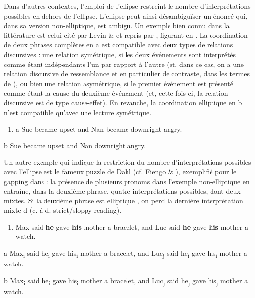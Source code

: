 Dans d'autres contextes, l'emploi de l'ellipse restreint le nombre d'interprétations possibles en dehors de l'ellipse. L'ellipse peut ainsi désambiguïser un énoncé qui, dans sa version non-elliptique, est ambigu. Un exemple bien connu dans la littérature est celui cité par Levin \& \citet{Prince1986} et repris par \citet{Kehler2002}, figurant en . La coordination de deux phrases complètes en a est compatible avec deux types de relations discursives : une relation symétrique, si les deux événements sont interprétés comme étant indépendants l'un par rapport à l'autre (et, dans ce cas, on a une relation discursive de ressemblance et en particulier de contraste, dans les termes de \citet{Kehler2002}), ou bien une relation asymétrique, si le premier événement est présenté comme étant la cause du deuxième événement (et, cette fois-ci, la relation discursive est de type cause-effet). En revanche, la coordination elliptique en b n'est compatible qu'avec une lecture symétrique. 


\begin{enumerate}
\item \label{bkm:Ref286308655}a  Sue became upset and Nan became downright angry.  


\end{enumerate}
  b  Sue became upset and Nan downright angry.  

Un autre exemple qui indique la restriction du nombre d'interprétations possibles avec l'ellipse est le fameux puzzle de Dahl (cf. Fiengo \& \citet{May1994}), exemplifié pour le gapping dans \citet{Coppock2001} : la présence de plusieurs pronoms dans l'exemple non-elliptique en  entraîne, dans la deuxième phrase, quatre interprétations possibles, dont deux mixtes. Si la deuxième phrase est elliptique , on perd la dernière interprétation mixte d (c.-à-d. strict/sloppy reading).  


\begin{enumerate}
\item \label{bkm:Ref286356267}Max said \textbf{he} gave \textbf{his} mother a bracelet, and Luc said \textbf{he} gave \textbf{his} mother a watch.  


\end{enumerate}
a  Max\textsubscript{i} said he\textsubscript{i} gave his\textsubscript{i} mother a bracelet, and Luc\textsubscript{j} said he\textsubscript{i} gave his\textsubscript{i} mother a watch. 

b  Max\textsubscript{i} said he\textsubscript{i} gave his\textsubscript{i} mother a bracelet, and Luc\textsubscript{j} said he\textsubscript{j} gave his\textsubscript{j} mother a watch.

